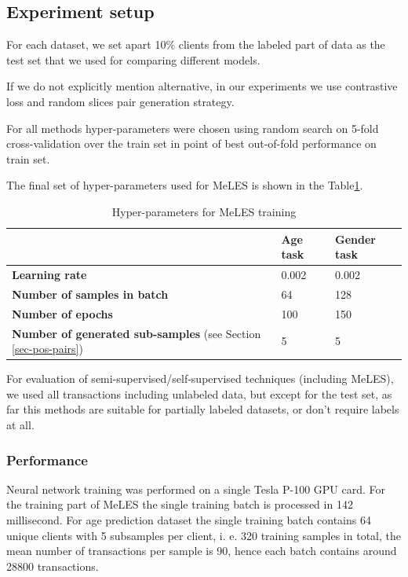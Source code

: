 \documentclass[sigconf, anonymous]{acmart}
\begin{document}
\subsection{Experiment setup}

For each dataset, we set apart 10\% clients from the labeled part of data as the test set that we used for comparing different models.

If we do not explicitly mention alternative, in our experiments we use contrastive loss and random slices pair generation strategy.

For all methods hyper-parameters were chosen using random search on 5-fold cross-validation over the train set in point of best out-of-fold performance on train set.

The final set of hyper-parameters used for MeLES is shown in the Table\ref{tab-hyper}.

\begin{table}[ht]
\caption{Hyper-parameters for MeLES training}
\begin{tabular}{ | m{18em} |  m{3em} | m{3em} | }
\hline
& \textbf{Age task} & \textbf{Gender task} \\
\hline
\textbf{Learning rate} & 0.002 & 0.002 \\
\textbf{Number of samples in batch} & 64 & 128 \\
\textbf{Number of epochs} & 100 & 150 \\
\textbf{Number of generated sub-samples} (see Section \ref{sec-pos-pairs}) & 5 & 5 \\
\hline
\end{tabular}
\label{tab-hyper}
\end{table}

For evaluation of semi-supervised/self-supervised techniques (including MeLES), we used all transactions including unlabeled data, but except for the test set, as far this methods are suitable for partially labeled datasets, or don't require labels at all.

\subsubsection{Performance}

Neural network training was performed on a single Tesla P-100 GPU card. For the training part of MeLES the single training batch is processed in 142 millisecond. For age prediction dataset the single training batch contains 64 unique clients with 5 subsamples per client, i. e. 320 training samples in total, the mean number of transactions per sample is 90, hence each batch contains around 28800 transactions.
\end{document}

